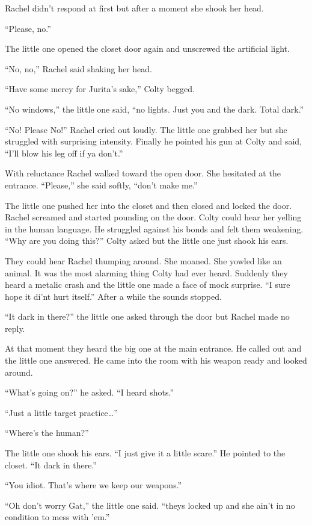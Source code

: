 Rachel didn't respond at first but after a moment she shook her head.

``Please, no.''

The little one opened the closet door again and unscrewed the artificial light.

``No, no,'' Rachel said shaking her head.

``Have some mercy for Jurita's sake,'' Colty begged.

``No windows,'' the little one said, ``no lights. Just you and the dark. Total dark.''

``No! Please No!'' Rachel cried out loudly. The little one grabbed her but she struggled with
surprising intensity. Finally he pointed his gun at Colty and said, ``I'll blow his leg off if
ya don't.''

With reluctance Rachel walked toward the open door. She hesitated at the entrance. ``Please,''
she said softly, ``don't make me.''

The little one pushed her into the closet and then closed and locked the door. Rachel screamed
and started pounding on the door. Colty could hear her yelling in the human language. He
struggled against his bonds and felt them weakening. ``Why are you doing this?'' Colty asked but
the little one just shook his ears.

They could hear Rachel thumping around. She moaned. She yowled like an animal. It was the most
alarming thing Colty had ever heard. Suddenly they heard a metalic crash and the little one made
a face of mock surprise. ``I sure hope it di'nt hurt itself.'' After a while the sounds stopped.

``It dark in there?'' the little one asked through the door but Rachel made no reply.

At that moment they heard the big one at the main entrance. He called out and the little one
answered. He came into the room with his weapon ready and looked around.

``What's going on?'' he asked. ``I heard shots.''

``Just a little target practice\ldots''

``Where's the human?''

The little one shook his ears. ``I just give it a little scare.'' He pointed to the closet. ``It
dark in there.''

``You idiot. That's where we keep our weapons.''

``Oh don't worry Gat,'' the little one said. ``theys locked up and she ain't in no condition to
mess with 'em.''

